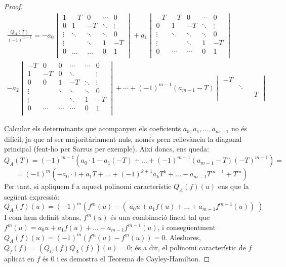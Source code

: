 \begin{proof}
\begin{gather*}
\frac{Q_A(T)}{(-1)^{m-1}} =
-a_0  
\begin{vmatrix} 
1 &-T & 0 & \cdots&0 \\ 
0 & 1 &-T & \ddots & \vdots \\ 
\vdots &\ddots &\ddots &\ddots & 0\\
\vdots & & \ddots &1 &-T \\ 
0 & \dots & \dots & 0 & 1 \\  
\end{vmatrix}
+ a_1  
\begin{vmatrix} 
-T &-T & 0 & \cdots&0 \\ 
0 & 1 &-T & \ddots & \vdots \\ 
\vdots &\ddots &\ddots &\ddots & 0\\
\vdots & & \ddots &1 &-T \\ 
0 & \cdots & \cdots & 0 & 1 \\  
\end{vmatrix}
\\
-a_2 
\begin{vmatrix} 
-T & 0 & 0 & \cdots& \cdots& 0 \\ 
1 & -T & 0 & \ddots & & \vdots \\ 
0 & 0 & 1 &-T & \ddots & \vdots \\
\vdots & &\ddots &\ddots &\ddots & 0\\
\vdots & & & \ddots &1 &-T \\ 
0 & \cdots& \cdots &\cdots & 0 & 1 \\  
\end{vmatrix}
+ \cdots + (-1)^{m-1}(a_{m-1}-T) 
\begin{vmatrix} 
-T & & \\ 
 &\ddots & \\
& &-T \\  
\end{vmatrix}
\end{gather*}

 

Calcular els determinants que acompanyen els coeficients $a_0, a_1, ..., a_{m+1}$ no és difícil, ja que al ser majoritàriament nuls, només pren rellevància la diagonal principal (fent-ho per Sarrus per exemple). Així doncs, ens queda:
$$ Q_A(T) = (-1)^{m-1} \left ( a_0\cdot1 - a_1(-T) + ... + (-1)^{m-1} (a_{m-1}-T) (-T)^{m-1} \right ) = $$
$$ = (-1)^{m} \left ( -a_0\cdot1 + a_1 T + ... + (-1)^{k+1}a_{k}T^k + ... - a_{m-1} T^{m-1} + T^m \right ) $$
Per tant, si apliquem f a aquest polinomi característic $Q_A(f)(u)$ ens que la següent expressió:
$$ Q_A(f)(u) = (-1)^m (f^m(u) - (\;a_0 u + a_1f(u) + ... + a_{m-1}f^{m-1}(u))\;)$$
I com hem definit abans, $f^m(u)$ és una combinació lineal tal que $f^m(u) = a_0 u + a_1f(u) + ... + a_{m-1}f^{m-1}(u)$, i consegüentment $Q_A(f)(u) = (-1)^m(f^m(u) - f^m(u)) = 0$. Aleshores, $Q_f(f) = (Q_C(f) Q_A(f))(u) = 0$; és a dir, el polinomi característic de $f$ aplicat en $f$ és 0 i es demostra el Teorema de Cayley-Hamilton.
\end{proof}

